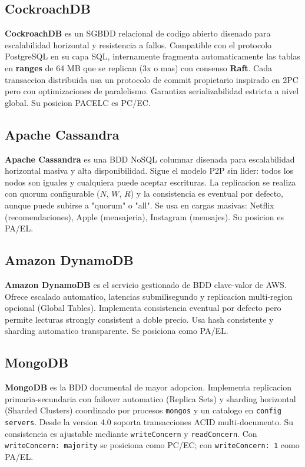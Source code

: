 \documentclass[11pt,a4paper]{article}
\begin{document}
\subsection{CockroachDB}

\textbf{CockroachDB} es un SGBDD relacional de codigo abierto disenado para escalabilidad horizontal y resistencia a fallos. Compatible con el protocolo PostgreSQL en su capa SQL, internamente fragmenta automaticamente las tablas en \textbf{ranges} de 64 MB que se replican (3x o mas) con consenso \textbf{Raft}. Cada transaccion distribuida usa un protocolo de commit propietario inspirado en 2PC pero con optimizaciones de paralelismo. Garantiza serializabilidad estricta a nivel global. Su posicion PACELC es PC/EC.

\subsection{Apache Cassandra}

\textbf{Apache Cassandra} es una BDD NoSQL columnar disenada para escalabilidad horizontal masiva y alta disponibilidad. Sigue el modelo P2P sin lider: todos los nodos son iguales y cualquiera puede aceptar escrituras. La replicacion se realiza con quorum configurable ($N$, $W$, $R$) y la consistencia es eventual por defecto, aunque puede subirse a "quorum" o "all". Se usa en cargas masivas: Netflix (recomendaciones), Apple (mensajeria), Instagram (mensajes). Su posicion es PA/EL.

\subsection{Amazon DynamoDB}

\textbf{Amazon DynamoDB} es el servicio gestionado de BDD clave-valor de AWS. Ofrece escalado automatico, latencias submilisegundo y replicacion multi-region opcional (Global Tables). Implementa consistencia eventual por defecto pero permite lecturas strongly consistent a doble precio. Usa hash consistente y sharding automatico transparente. Se posiciona como PA/EL.

\subsection{MongoDB}

\textbf{MongoDB} es la BDD documental de mayor adopcion. Implementa replicacion primaria-secundaria con failover automatico (Replica Sets) y sharding horizontal (Sharded Clusters) coordinado por procesos \texttt{mongos} y un catalogo en \texttt{config servers}. Desde la version 4.0 soporta transacciones ACID multi-documento. Su consistencia es ajustable mediante \texttt{writeConcern} y \texttt{readConcern}. Con \texttt{writeConcern: majority} se posiciona como PC/EC; con \texttt{writeConcern: 1} como PA/EL.
\end{document}
